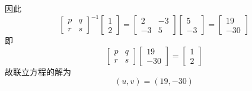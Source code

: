 \begin{questions}
\begin{solution}
\[        \]
        因此
        \[
        \begin{bmatrix} p & q \\ r & s \end{bmatrix}^{-1} \begin{bmatrix} 1 \\ 2 \end{bmatrix} 
        = \begin{bmatrix} 2 & -3 \\ -3 & 5 \end{bmatrix} \begin{bmatrix} 5 \\ -3 \end{bmatrix} 
        = \begin{bmatrix} 19 \\ -30 \end{bmatrix}
        \]
        即
        \[
        \begin{bmatrix} p & q \\ r & s \end{bmatrix} \begin{bmatrix} 19 \\ -30 \end{bmatrix} = \begin{bmatrix} 1 \\ 2 \end{bmatrix}
        \]
        故联立方程的解为
        \[
        (u,v) = (19,-30)
        \]
    \end{solution}


\end{questions}

